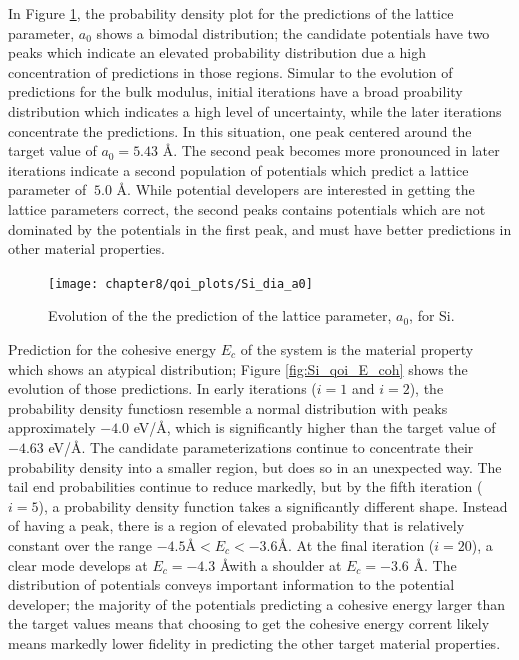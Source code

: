 In Figure \ref{fig:Si_qoi_a0}, the probability density plot for the predictions of the lattice parameter, $a_0$ shows a bimodal distribution; the candidate potentials have two peaks which indicate an elevated probability distribution due a high concentration of predictions in those regions.
Simular to the evolution of predictions for the bulk modulus, initial iterations have a broad proability distribution which indicates a high level of uncertainty, while the later iterations concentrate the predictions.
In this situation, one peak centered around the target value of $a_0=5.43$ \AA.  The second peak becomes more pronounced in later iterations indicate a second population of potentials which predict a lattice parameter of $~5.0$ \AA.
While potential developers are interested in getting the lattice parameters correct, the second peaks contains potentials which are not dominated by the potentials in the first peak, and must have better predictions in other material properties.
\begin{figure}[h]
	\centering
	\texttt{[image: chapter8/qoi\_plots/Si\_dia\_a0]}
	\caption{Evolution of the the prediction of the lattice parameter, $a_0$, for Si.}
	\label{fig:Si_qoi_a0}
\end{figure}

Prediction for the cohesive energy $E_c$ of the system is the material property which shows an atypical distribution; Figure \ref{fig:Si_qoi_E_coh} shows the evolution of those predictions.
In early iterations ($i=1$ and $i=2$), the probability density functiosn resemble a normal distribution with peaks approximately $-4.0$ eV/\AA, which is significantly higher than the target value of $-4.63$ eV/\AA.
The candidate parameterizations continue to concentrate their probability density into a smaller region, but does so in an unexpected way.
The tail end probabilities continue to reduce markedly, but by the fifth iteration ($i=5$), a probability density function takes a significantly different shape.
Instead of having a peak, there is a region of elevated probability that is relatively constant over the range $-4.5 \text{\AA} < E_c < -3.6 \text{\AA}$.
At the final iteration ($i=20$), a clear mode develops at $E_c=-4.3$ \AA with a shoulder at $E_c=-3.6$ \AA.
The distribution of potentials conveys important information to the potential developer; the majority of the potentials predicting a cohesive energy larger than the target values means that choosing to get the cohesive energy corrent likely means markedly lower fidelity in predicting the other target material properties.

